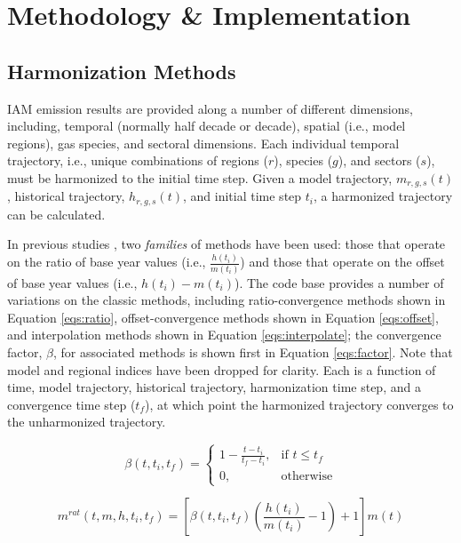 \section{Methodology \& Implementation}\label{sec:meths}

\subsection{Harmonization Methods}

IAM emission results are provided along a number of different dimensions,
including, temporal (normally half decade or decade), spatial (i.e., model
regions), gas species, and sectoral dimensions. Each individual temporal
trajectory, i.e., unique combinations of regions ($r$), species ($g$), and
sectors ($s$), must be harmonized to the initial time step. Given a model
trajectory, $m_{r, g, s}(t)$, historical trajectory, $h_{r, g, s}(t)$, and
initial time step $t_i$, a harmonized trajectory can be calculated.

In previous studies \cite{meinshausen_rcp_2011,rogelj_discrepancies_2011}, two
\textit{families} of methods have been used: those that operate on the ratio of
base year values (i.e., $\frac{h(t_i)}{m(t_i)}$) and those that operate on the
offset of base year values (i.e., $h(t_i) - m(t_i)$). The  code
base provides a number of variations on the classic methods, including
ratio-convergence methods shown in Equation \ref{eqs:ratio}, offset-convergence
methods shown in Equation \ref{eqs:offset}, and interpolation methods shown in
Equation \ref{eqs:interpolate}; the convergence factor, $\beta$, for associated
methods is shown first in Equation \ref{eqs:factor}. Note that model and
regional indices have been dropped for clarity. Each is a function of time,
model trajectory, historical trajectory, harmonization time step, and a
convergence time step ($t_f$), at which point the harmonized trajectory
converges to the unharmonized trajectory.

\begin{equation}\label{eqs:factor}
  \beta(t, t_i, t_f) =
  \begin{cases}
    1 - \frac{t - t_i}{t_f - t_i},& \text{if } t \leq t_f\\
    0,                        & \text{otherwise}
  \end{cases}
\end{equation}

\begin{equation}\label{eqs:ratio}
  m^{rat}(t, m, h, t_i, t_f) = [\beta(t, t_i, t_f) (\frac{h(t_i)}{m(t_i)} - 1) + 1] m(t)
\end{equation}

